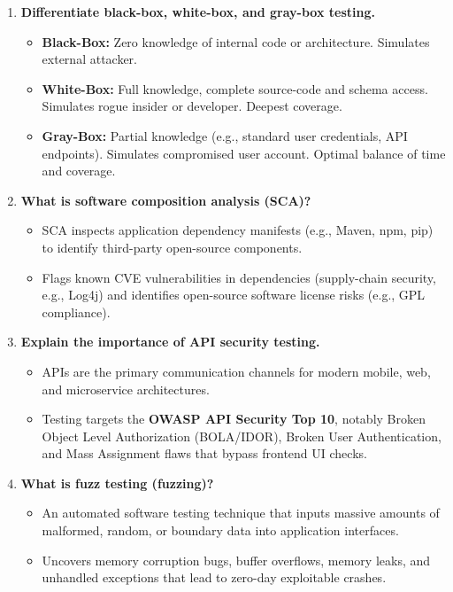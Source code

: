 \begin{enumerate}[label=\textbf{Q\arabic*.,resume},leftmargin=1.2cm]
\item \textbf{Differentiate black-box, white-box, and gray-box testing.}
\begin{itemize}
\item \textbf{Black-Box:} Zero knowledge of internal code or architecture. Simulates external attacker.
\item \textbf{White-Box:} Full knowledge, complete source-code and schema access. Simulates rogue insider or developer. Deepest coverage.
\item \textbf{Gray-Box:} Partial knowledge (e.g., standard user credentials, API endpoints). Simulates compromised user account. Optimal balance of time and coverage.
\end{itemize}

\item \textbf{What is software composition analysis (SCA)?}
\begin{itemize}
\item SCA inspects application dependency manifests (e.g., Maven, npm, pip) to identify third-party open-source components.
\item Flags known CVE vulnerabilities in dependencies (supply-chain security, e.g., Log4j) and identifies open-source software license risks (e.g., GPL compliance).
\end{itemize}

\item \textbf{Explain the importance of API security testing.}
\begin{itemize}
\item APIs are the primary communication channels for modern mobile, web, and microservice architectures.
\item Testing targets the \textbf{OWASP API Security Top 10}, notably Broken Object Level Authorization (BOLA/IDOR), Broken User Authentication, and Mass Assignment flaws that bypass frontend UI checks.
\end{itemize}

\item \textbf{What is fuzz testing (fuzzing)?}
\begin{itemize}
\item An automated software testing technique that inputs massive amounts of malformed, random, or boundary data into application interfaces.
\item Uncovers memory corruption bugs, buffer overflows, memory leaks, and unhandled exceptions that lead to zero-day exploitable crashes.
\end{itemize}


\end{enumerate}

